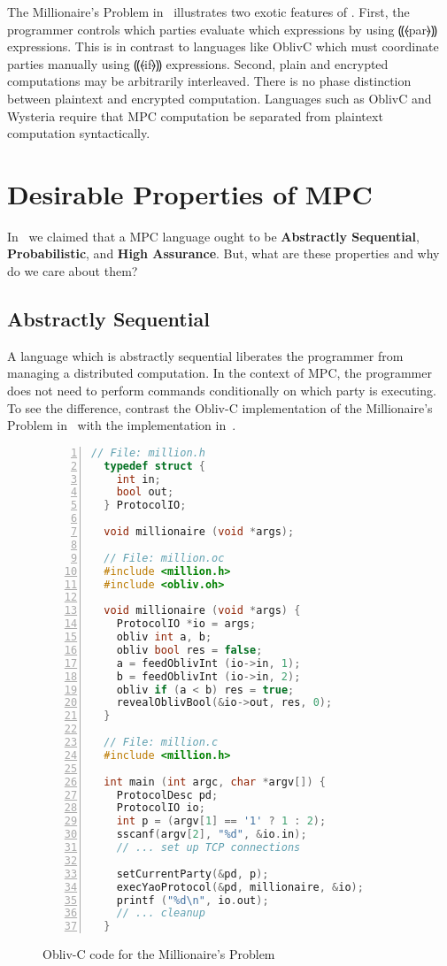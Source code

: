 The Millionaire's Problem in~ illustrates two exotic features of \mpc. First, the programmer
controls which parties evaluate which expressions by using ⸨⦑par⦒⸩ expressions. This is in contrast to languages like OblivC
which must coordinate parties manually using ⸨⦑if⦒⸩ expressions. Second, plain and encrypted computations may be arbitrarily
interleaved. There is no phase distinction between plaintext and encrypted computation. Languages such as OblivC and Wysteria
require that MPC computation be separated from plaintext computation syntactically.

\section{Desirable Properties of MPC}
\label{sec:background-properties}

In~ we claimed that a MPC language ought to be \textbf{Abstractly Sequential}, \textbf{Probabilistic},
and \textbf{High Assurance}. But, what are these properties and why do we care about them?

\subsection{Abstractly Sequential}
\label{subsec:background-properties-centralized}

A language which is abstractly sequential liberates the programmer from managing a distributed computation. In the context of MPC,
the programmer does not need to perform commands conditionally on which party is executing. To see the difference, contrast the
Obliv-C implementation of the Millionaire's Problem in~ with the \mpc implementation
in~.

\begin{figure}[h]
\begin{lstlisting}[language=c,basicstyle=\footnotesize\ttfamily,numbers=left,stepnumber=1]
  // File: million.h
  typedef struct {
    int in;
    bool out;
  } ProtocolIO;

  void millionaire (void *args);

  // File: million.oc
  #include <million.h>
  #include <obliv.oh>

  void millionaire (void *args) {
    ProtocolIO *io = args;
    obliv int a, b;
    obliv bool res = false;
    a = feedOblivInt (io->in, 1);
    b = feedOblivInt (io->in, 2);
    obliv if (a < b) res = true;
    revealOblivBool(&io->out, res, 0);
  }

  // File: million.c
  #include <million.h>

  int main (int argc, char *argv[]) {
    ProtocolDesc pd;
    ProtocolIO io;
    int p = (argv[1] == '1' ? 1 : 2);
    sscanf(argv[2], "%d", &io.in);
    // ... set up TCP connections

    setCurrentParty(&pd, p);
    execYaoProtocol(&pd, millionaire, &io);
    printf ("%d\n", io.out);
    // ... cleanup
  }
\end{lstlisting}
\caption{Obliv-C code for the Millionaire's Problem}
\label{fig:millionaires-oblivc}
\end{figure}

